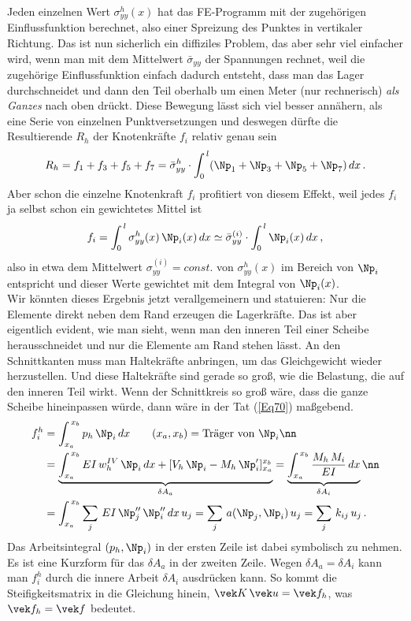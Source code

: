 {Jeden einzelnen Wert $\sigma_{yy}^h(x)$ hat das FE-Programm mit der zugeh\"{o}rigen Einflussfunktion berechnet, also einer Spreizung des Punktes in vertikaler Richtung. Das ist nun sicherlich ein diffiziles Problem, das aber sehr viel einfacher wird, wenn man mit dem Mittelwert $\bar{\sigma}_{yy}$ der Spannungen rechnet, weil die zugeh\"{o}rige Einflussfunktion einfach dadurch entsteht, dass man das Lager durchschneidet und dann den Teil oberhalb um einen Meter (nur rechnerisch) {\em als Ganzes\/} nach oben dr\"{u}ckt. Diese Bewegung l\"{a}sst sich viel besser ann\"{a}hern, als eine Serie von einzelnen Punktversetzungen und deswegen d\"{u}rfte die Resultierende $R_h$ der Knotenkr\"{a}fte $f_i$ relativ genau sein
\begin{align}
R_h = f_1 + f_3 + f_5 + f_7 = \bar{\sigma}_{yy}^h \cdot \int_0^{\,l} (\Np_1 + \Np_3 + \Np_5 + \Np_7)\,dx\,.
\end{align}
Aber schon die einzelne Knotenkraft $f_i$ profitiert von diesem Effekt, weil jedes $f_i$ ja selbst schon ein gewichtetes Mittel ist
\begin{align}
f_i = \int_0^{\,l} \sigma_{yy}^{h}(x)\,\Np_i(x)\,dx \simeq \bar{\sigma}_{yy}^{(i)}\cdot\int_0^{\,l} \Np_i(x)\,dx\,,
\end{align}
also in etwa dem Mittelwert $\sigma_{yy}^{(i)} = const.$ von $\sigma_{yy}^{h}(x)$ im Bereich von $\Np_i$ entspricht und dieser Werte gewichtet mit dem Integral von $\Np_i(x)$.
\\

Wir k\"{o}nnten dieses Ergebnis jetzt verallgemeinern und statuieren: Nur die Elemente direkt neben dem Rand erzeugen die Lagerkr\"{a}fte.
Das ist aber eigentlich evident, wie man sieht, wenn man den inneren Teil einer Scheibe herausschneidet und nur die Elemente am Rand stehen l\"{a}sst. An den Schnittkanten muss man Haltekr\"{a}fte anbringen, um das Gleichgewicht wieder herzustellen. Und diese Haltekr\"{a}fte sind gerade so gro{\ss}, wie die Belastung, die auf den inneren Teil wirkt. Wenn der Schnittkreis so gro{\ss} w\"{a}re, dass die ganze Scheibe hineinpassen w\"{u}rde, dann w\"{a}re in der Tat (\ref{Eq70}) ma{\ss}gebend.\\

\begin{align}
f_i^h &= \int_{x_a}^{\,x_b} p_h \,\Np_i\,dx \qquad (x_a,x_b) = \text{Tr\"{a}ger von $\Np_i$}\nn \\
&= \underbrace{\int_{x_a}^{\,x_b} EI\,w_h^{IV}\,\Np_i\,dx + [V_h \,\Np_i - M_h\,\Np_i']_{x_a}^{x_b} }_{\delta A_a} = \underbrace{\int_{x_a}^{\,x_b} \frac{M_h\,M_i}{EI}\,dx}_{\delta A_i}\nn \\
&= \int_{x_a}^{\,x_b} \sum_j\,EI\,\Np_j''\,\Np_i''\,dx \,u_j= \sum_j\,a(\Np_j,\Np_i)\,u_j = \sum_j\,k_{ij}\,u_j\,.
\end{align}
Das Arbeitsintegral $(p_h,\Np_i)$ in der ersten Zeile ist dabei symbolisch zu nehmen. Es ist eine Kurzform f\"{u}r das $\delta A_a$ in der zweiten Zeile. Wegen $\delta A_a = \delta A_i$ kann man $f_i^h$ durch die innere Arbeit $\delta A_i$ ausdr\"{u}cken kann. So kommt die Steifigkeitsmatrix in die Gleichung hinein, $\vek K\,\vek u = \vek f_h$, was $\vek f_h = \vek f$ bedeutet.

}
